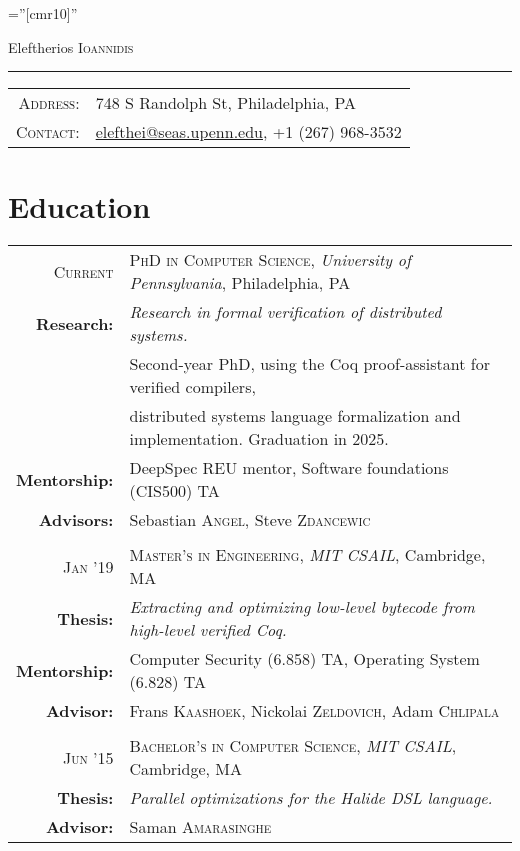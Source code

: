 \documentclass[lettersize,11pt]{article}
\begin{document}
\pagestyle{empty} %
\font\fb=''[cmr10]'' %

\par{\centering
		{\Huge Eleftherios \textsc{Ioannidis}
	}
	\bigskip\par}

\hrule
\begin{tabular}{rl}
    \textsc{Address:}   & 748 S Randolph St, Philadelphia, PA \\
    \textsc{Contact:}   & \href{mailto:elefthei@seas.upenn.edu}{elefthei@seas.upenn.edu}, +1 (267) 968-3532 \\
\end{tabular}

\section{Education}
\begin{tabular}{rl}
\textsc{Current} & \textsc{PhD in Computer Science}, \emph{University of Pennsylvania}, Philadelphia, PA\\
\textbf{Research:} & \emph{Research in formal verification of distributed systems.}\\
& Second-year PhD, using the Coq proof-assistant for verified compilers, \\
& distributed systems language formalization and implementation. Graduation in 2025. \\
\textbf{Mentorship:} & DeepSpec REU mentor, Software foundations (CIS500) TA \\
\textbf{Advisors:} & Sebastian \textsc{Angel}, Steve \textsc{Zdancewic}\\
 & \\[-0.5em]
\textsc{Jan} '19 & \textsc{Master's in Engineering}, \emph{MIT} \emph{CSAIL}, Cambridge, MA\\
\textbf{Thesis:} & \emph{Extracting and optimizing low-level bytecode from high-level verified Coq.}\\
\textbf{Mentorship:} & Computer Security (6.858) TA, Operating System (6.828) TA \\
\textbf{Advisor:} & Frans \textsc{Kaashoek}, Nickolai \textsc{Zeldovich}, Adam \textsc{Chlipala}\\
 & \\[-0.5em]
\textsc{Jun} '15 & \textsc{Bachelor's in Computer Science}, \emph{MIT} \emph{CSAIL}, Cambridge, MA\\
\textbf{Thesis:} & \emph{Parallel optimizations for the Halide DSL language.}\\
\textbf{Advisor:} & Saman \textsc{Amarasinghe}\\
\end{tabular}
\end{document}
